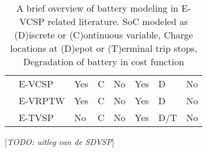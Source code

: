 \documentclass[]{article}
\newcommand{\todo}[1]{{\color{red}[\textit{TODO: #1}]}}
\begin{document}
\begin{landscape}
\begin{table}[h]
\begin{tabular}{llllllll}
    \citet{Cong2024}             & E-VCSP  & Yes & C   & No            & Yes         & D            & No          \\
    \addlinespace[0.4em]
    \citet{Ham2021}              & E-VRPTW & Yes & C   & No            & Yes         & D            & No          \\
    \citet{Stadnichuk2024}       & E-TVSP  & No  & C   & No            & Yes         & D/T          & No          \\
    \bottomrule
  \end{tabular}
  \caption{A brief overview of battery modeling in E-VCSP related literature. SoC modeled as (D)iscrete or (C)ontinuous variable, Charge locations at (D)epot or (T)erminal trip stops, Degradation of battery in cost function}
  \label{tab:eVCSP-lit}
\end{table}
\vfill
\end{landscape}

\todo{uitleg van de SDVSP}
\end{document}
